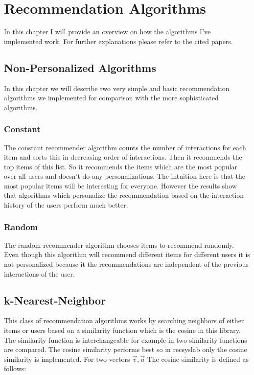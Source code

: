 
\chapter{Recommendation Algorithms}
\label{recommendationalgorithms}
In this chapter I will provide an overview on how the algorithms I've implemented
work. For further explanations please refer to the cited papers.


\section{Non-Personalized Algorithms}

In this chapter we will describe two very simple and basic recommendation
algorithms we implemented for comparison with the more sophisticated
algorithms.


\subsection{Constant}

The constant recommender algorithm counts the number of interactions
for each item and sorts this in decreasing order of interactions.
Then it recommends the top items of this list. So it recommends the
items which are the most popular over all users and doesn't do any
personalizations. The intuition here is that the most popular items
will be interesting for everyone. However the results show that
algorithms which personalize the recommendation based on the 
interaction history of the users perform much better.


\subsection{Random}

The random recommender algorithm chooses items to recommend randomly.
Even though this algorithm will recommend different items for different
users it is not personalized because it the recommendations are
independent of the previous interactions of the user.


\section{k-Nearest-Neighbor}

This class of recommendation algorithms works by searching neighbors
of either items or users based on a similarity function which is the
cosine in this library. The similarity function is interchangeable 
for example in
\cite{Karypis:2001:EIT:502585.502627} two similarity functions are
compared. The cosine similarity performs best so in recsyslab only the cosine similarity
is implemented. For two vectors \(\overrightarrow{v},\overrightarrow{u}\)
The cosine similarity is defined as follows:

